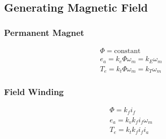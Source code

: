 \documentclass{article}
\begin{document}
    \subsection*{Generating Magnetic Field}    
    \subsubsection*{Permanent Magnet}
    \begin{align*}
        \Phi = \text{constant}\\
        e_{a} = k_{e} \Phi \omega_{m} = k_{E} \omega_{m}\\
        T_{e} = k_{t} \Phi \omega_{m} = k_{T} \omega_{m}
    \end{align*}

    \subsubsection*{Field Winding}
    \begin{align*}
        \Phi = k_{f}i_{f}\\
        e_{a} = k_{v}k_{f}i_{f} \omega_{m}\\
        T_{e} = k_{t} k_{f} i_{f} i_{a}
    \end{align*}



        

    

    
\end{document}
